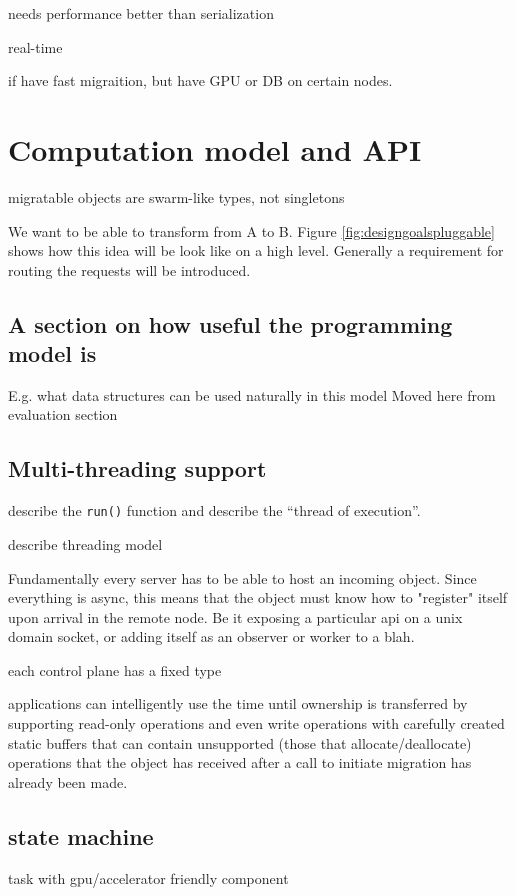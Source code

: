 needs performance better than serialization

real-time

if have fast migraition, but have GPU or DB on certain nodes.



\section{Computation model and API}
\label{sec:api}
migratable objects are swarm-like types, not singletons

We want to be able to transform from A to B. Figure
\ref{fig:designgoalspluggable} shows how this idea will be look like on a high
level. Generally a requirement for routing the requests will be introduced.


\subsection{A section on how useful the programming model is}
E.g. what data structures can be used naturally in this model
Moved here from evaluation section
\subsection{Multi-threading support}

describe the \texttt{run()} function and describe the ``thread of execution''.

describe threading model


Fundamentally every server has to be able to host an incoming object.
Since everything is async, this means that the object must know how to
"register" itself upon arrival in the remote node. Be it exposing a particular
api on a unix domain socket, or adding itself as an observer or worker to a blah.

each control plane has a fixed type

applications can intelligently use the time until ownership is transferred by
supporting read-only operations and even write operations with carefully
created static buffers that can contain unsupported (those that allocate/deallocate)
operations that the object has received after a call to initiate migration has
already been made.


\subsection{state machine}
task with gpu/accelerator friendly component

